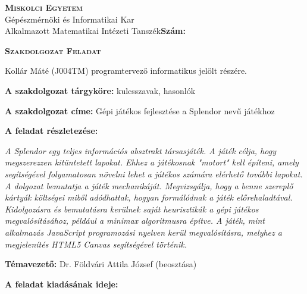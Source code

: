 \begin{flushleft}
\textsc{\bfseries Miskolci Egyetem}\\
Gépészmérnöki és Informatikai Kar\\
Alkalmazott Matematikai Intézeti Tanszék\hspace*{4cm}\hfil \textbf{Szám:}
\end{flushleft}
\vskip 0.5cm
\begin{center}
\large\textsc{\bfseries Szakdolgozat Feladat}
\end{center}
\vskip 0.5cm
Kollár Máté (J004TM) programtervező informatikus jelölt részére.\newline

\noindent\textbf{A szakdolgozat tárgyköre:} kulcsszavak, hasonlók\newline

\noindent\textbf{A szakdolgozat címe:} Gépi játékos fejlesztése a Splendor nevű játékhoz\newline

\noindent\textbf{A feladat részletezése:}

\medskip

\emph{A Splendor egy teljes információs absztrakt társasjáték. A játék célja, hogy megszerezzen kitüntetett lapokat. Ehhez a játékosnak "motort" kell építeni, amely segítségével folyamatosan növelni lehet a játékos számára elérhető további lapokat. A dolgozat bemutatja a játék mechanikáját. Megvizsgálja, hogy a benne szereplő kártyák költségei miből adódhattak, hogyan formálódnak a játék előrehaladtával. Kidolgozásra és bemutatásra kerülnek saját heurisztikák a gépi játékos megvalósításához, például a minimax algoritmusra építve. A játék, mint alkalmazás JavaScript programozási nyelven kerül megvalósításra, melyhez a megjelenítés HTML5 Canvas segítségével történik.}

\vfill

\noindent\textbf{Témavezető:} Dr. Földvári Attila József (beosztása) \newline


\noindent\textbf{A feladat kiadásának ideje:}\newline


\vskip 2cm


